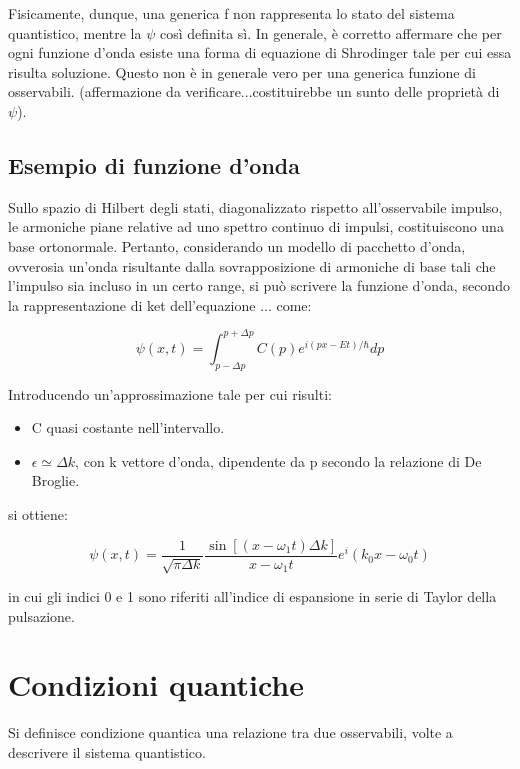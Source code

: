 \documentclass{article}
\begin{document}
Fisicamente, dunque, una generica f non rappresenta lo stato del sistema quantistico, mentre la $\psi$ così definita sì.
In generale, è corretto affermare che per ogni funzione d'onda esiste una forma di equazione di Shrodinger tale per cui essa risulta soluzione. Questo non è in generale vero
per una generica funzione di osservabili. (affermazione da verificare...costituirebbe un sunto delle proprietà di $\psi$).


\subsection{Esempio di funzione d'onda}
Sullo spazio di Hilbert degli stati, diagonalizzato rispetto all'osservabile impulso, le armoniche piane relative ad uno spettro continuo di impulsi, costituiscono una base ortonormale.
Pertanto, considerando un modello di pacchetto d'onda, ovverosia un'onda risultante dalla sovrapposizione di armoniche di base tali che l'impulso sia incluso in
un certo range, si può scrivere la funzione d'onda, secondo la rappresentazione di ket dell'equazione ... come:

\begin{equation}
    \psi(x,t)=\int_{p-\Delta p}^{p+\Delta p} C(p)e^{i(px-Et)/\hbar}dp
\end{equation}

Introducendo un'approssimazione tale per cui risulti:

\begin{itemize}
    \item C quasi costante nell'intervallo.
    \item $\epsilon \simeq \Delta k$, con k vettore d'onda, dipendente da p secondo la relazione di De Broglie.
\end{itemize}

si ottiene:

\begin{equation}
    \psi(x,t)= \frac{1}{\sqrt{\pi \Delta k}}\frac{\sin[(x-\omega_1 t)\Delta k]}{x-\omega_1 t}e^i(k_0x-\omega_0t)
\end{equation}

in cui gli indici 0 e 1 sono riferiti all'indice di espansione in serie di Taylor della pulsazione.

\section{Condizioni quantiche}
Si definisce condizione quantica una relazione tra due osservabili, volte a descrivere il sistema quantistico.
\end{document}

